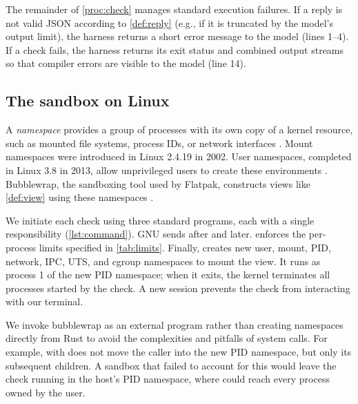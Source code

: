 \documentclass[10pt,twocolumn,a4paper]{article}
\begin{document}
The remainder of \cref{proc:check} manages standard execution failures. If a reply is not valid JSON according to \cref{def:reply} (e.g., if it is truncated by the model's output limit), the harness returns a short error message to the model (lines 1--4). If a check fails, the harness returns its exit status and combined output streams so that compiler errors are visible to the model (line 14).

\subsection{The sandbox on Linux}

A \emph{namespace} provides a group of processes with its own copy of a kernel resource, such as mounted file systems, process IDs, or network interfaces \cite{namespaces7}. Mount namespaces were introduced in Linux 2.4.19 in 2002. User namespaces, completed in Linux 3.8 in 2013, allow unprivileged users to create these environments \cite{kerrisk2013namespaces,userns7}. Bubblewrap, the sandboxing tool used by Flatpak, constructs views like \cref{def:view} using these namespaces \cite{bubblewrap}.




We initiate each check using three standard programs, each with a single responsibility (\cref{lst:command}). GNU  sends  after  and   later.  enforces the per-process limits specified in \cref{tab:limits}. Finally,  creates new user, mount, PID, network, IPC, UTS, and cgroup namespaces to mount the view. It runs as process 1 of the new PID namespace; when it exits, the kernel terminates all processes started by the check. A new session prevents the check from interacting with our terminal.

We invoke bubblewrap as an external program rather than creating namespaces directly from Rust to avoid the complexities and pitfalls of system calls. For example,  with  does not move the caller into the new PID namespace, but only its subsequent children. A sandbox that failed to account for this would leave the check running in the host's PID namespace, where  could reach every process owned by the user.
\end{document}
